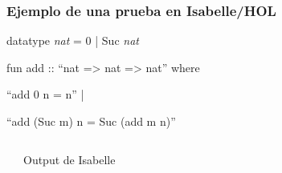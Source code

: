 \begin{frame}
\frametitle{Ejemplo de una prueba en Isabelle/HOL}

\begin{semiverbatim}
datatype \textit{nat} = 0 | Suc \textit{nat}


fun add :: ``nat => nat => nat'' where

\alert<2>{``add 0 n = n''} |

\alert<4>{``add (Suc m) n = Suc (add m n)''}
\end{semiverbatim}

\begin{columns}[t]
\begin{semiverbatim}
\end{semiverbatim}
\begin{block}{Output de Isabelle}
\begin{semiverbatim}

\end{semiverbatim}
\end{block}
\end{columns}


\end{frame}

